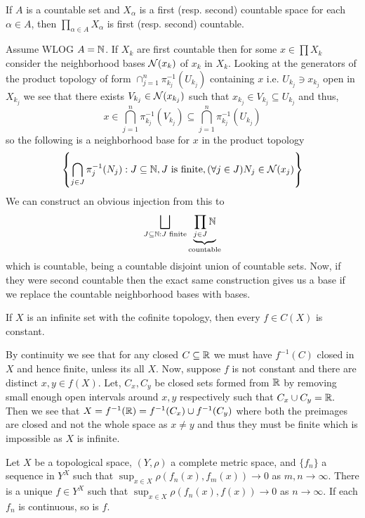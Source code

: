 \documentclass[12pt,a4paper]{article}
\begin{document}
\begin{problem}\label{prob:4-20}
If $A$ is a countable set and $X_\alpha$ is a first (resp. second) countable space for each $\alpha \in A$, then $\prod_{\alpha \in A} X_\alpha$ is first (resp. second) countable.
\end{problem}
\begin{solution}
    Assume WLOG $A=\mathbb{N}$. 
    If $X_k$ are first countable then for some $x\in\prod X_k$ consider the neighborhood bases $\mathcal{N}(x_k)$ of $x_k$ in $X_k.$
    Looking at the generators of the product topology of form $\cap_{j=1}^n\pi_{k_j}^{-1}(U_{k_j})$ containing $x$ i.e. $U_{k_j}\ni x_{k_j}$ open in $X_{k_j}$ we see that there exists $V_{k_j}\in\mathcal{N}(x_{k_j})$ such that $x_{k_j}\in V_{k_j} \subseteq U_{k_j}$ and thus,
    \[
        x\in\bigcap_{j=1}^n\pi^{-1}_{k_j}(V_{k_j}) \subseteq\bigcap_{j=1}^n\pi_{k_j}^{-1}(U_{k_j})
    \]
   so the following is a neighborhood base for $x$ in the product topology
   \[
       \qty{\bigcap_{j\in J}\pi_j^{-1}(N_j):J \subseteq\mathbb{N},J\text{ is finite},(\forall j\in J)N_j\in\mathcal{N}(x_j)}
   \]
   We can construct an obvious injection from this to
   \[
       \bigsqcup_{J \subseteq\mathbb{N}:J\text{ finite}}\underbrace{\prod_{j\in J}\mathbb{N}}_{\text{countable}}
   \]
   which is countable, being a countable disjoint union of countable sets. 
   Now, if they were second countable then the exact same construction gives us a base if we replace the countable neighborhood bases with bases.
\end{solution}
\begin{problem}\label{prob:4-21}
If $X$ is an infinite set with the cofinite topology, then every $f \in C(X)$ is constant.
\end{problem}
\begin{solution}
    By continuity we see that for any closed $C\subseteq\mathbb{R}$ we must have $f^{-1}(C)$ closed in $X$ and hence finite, unless its all $X.$ 
    Now, suppose $f$ is not constant and there are distinct $x,y\in f(X).$ 
    Let, $C_x,C_y$ be closed sets formed from $\mathbb{R}$ by removing small enough open intervals around $x,y$ respectively such that $C_x\cup C_y=\mathbb{R}.$ 
    Then we see that $X=f^{-1}(\mathbb{R})=f^{-1}(C_x)\cup f^{-1}(C_y)$ where both the preimages are closed and not the whole space as $x\neq y$ and thus they must be finite which is impossible as $X$ is infinite. 
\end{solution}
\begin{problem}\label{prob:4-22}
Let $X$ be a topological space, $(Y,\rho)$ a complete metric space, and $\{f_n\}$ a sequence in $Y^X$ such that $\sup_{x \in X} \rho(f_n(x), f_m(x)) \to 0$ as $m, n \to \infty$. There is a unique $f \in Y^X$ such that $\sup_{x \in X} \rho(f_n(x), f(x)) \to 0$ as $n \to \infty$. If each $f_n$ is continuous, so is $f$.
\end{problem}
\end{document}
